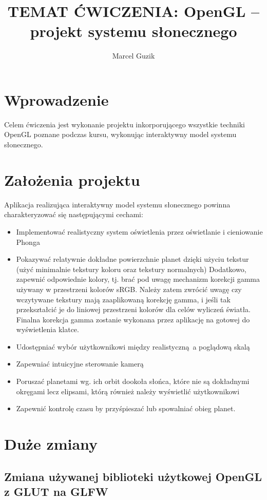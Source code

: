 \documentclass[a4paper]{article}
\title{TEMAT ĆWICZENIA: OpenGL – projekt systemu słonecznego}
\author{Marcel Guzik}
\begin{document}
\section{Wprowadzenie}

Celem ćwiczenia jest wykonanie projektu inkorporującego wszystkie techniki
OpenGL poznane podczas kursu, wykonując interaktywny model systemu słonecznego.

\section{Założenia projektu}

Aplikacja realizująca interaktywny model systemu słonecznego powinna
charakteryzować się następującymi cechami:

\begin{itemize}
    \item Implementować realistyczny system oświetlenia przez oświetlanie i
          cieniowanie Phonga
    \item Pokazywać relatywnie dokładne powierzchnie planet dzięki użyciu
          tekstur (użyć minimalnie tekstury koloru oraz tekstury normalnych)
          Dodatkowo, zapewnić odpowiednie kolory, tj. brać pod uwagę mechanizm
          korekcji gamma używany w przestrzeni kolorów sRGB. Należy zatem
          zwrócić uwagę czy wczytywane tekstury mają zaaplikowaną korekcję
          gamma, i jeśli tak przekształcić je do liniowej przestrzeni kolorów
          dla celów wyliczeń światła. Finalna korekcja gamma zostanie wykonana
          przez aplikację na gotowej do wyświetlenia klatce.
    \item Udostępniać wybór użytkownikowi między realistyczną a poglądową skalą
    \item Zapewniać intuicyjne sterowanie kamerą
    \item Poruszać planetami wg. ich orbit dookoła słońca, które nie są
          dokładnymi okręgami lecz elipsami, którą również należy wyświetlić
          użytkownikowi
    \item Zapewnić kontrolę czasu by przyśpieszać lub spowalniać obieg planet.
\end{itemize}

\section{Duże zmiany}

\subsection{Zmiana używanej biblioteki użytkowej OpenGL z GLUT na GLFW}
\end{document}
